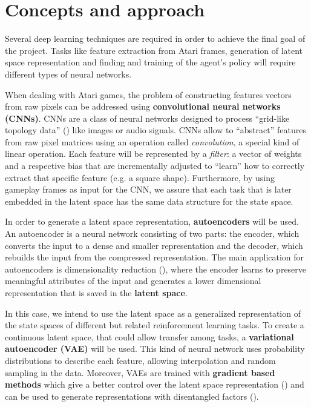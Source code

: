 \section{Concepts and approach}

Several deep learning techniques are required in order to achieve the final goal of the project. Tasks like feature extraction from Atari frames, generation of latent space representation and finding and training of the agent's policy will require different types of neural networks.

When dealing with Atari games, the problem of constructing features vectors from raw pixels can be addressed using \textbf{convolutional neural networks (CNNs)}.
CNNs are a class of neural networks designed to process ``grid-like topology data'' (\cite{goodfellow2016deep}) like images or audio signals. CNNs allow to ``abstract'' features from raw pixel matrices using an operation called \textit{convolution}, a special kind of linear operation. Each feature will be represented by a \textit{filter}: a vector of weights and a respective bias that are incrementally adjusted to ``learn'' how to correctly extract that specific feature (e.g. a square shape). 
Furthermore, by using gameplay frames as input for the CNN, we assure that each task that is later embedded in the latent space has the same data structure for the state space.  

In order to generate a latent space representation, \textbf{autoencoders} will be used. An autoencoder is a neural network consisting of two parts: the encoder, which converts the input to a dense and smaller representation and the decoder, which rebuilds the input from the compressed representation. The main application for autoencoders is dimensionality reduction (\cite{Hinton504}), where the encoder learns to preserve meaningful attributes of the input and generates a lower dimensional representation that is saved in the \textbf{latent space}. 

In this case, we intend to use the latent space as a generalized representation of the state spaces of different but related reinforcement learning tasks. To create a continuous latent space, that could allow transfer among tasks, a \textbf{variational autoencoder (VAE)} will be used. This kind of neural network uses probability distributions to describe each feature, allowing interpolation and random sampling in the data. Moreover, VAEs are trained with \textbf{gradient based methods} which give a better control over the latent space representation (\cite{goodfellow2016deep}) and can be used to generate representations with disentangled factors (\cite{2016arXiv160605579H}).

